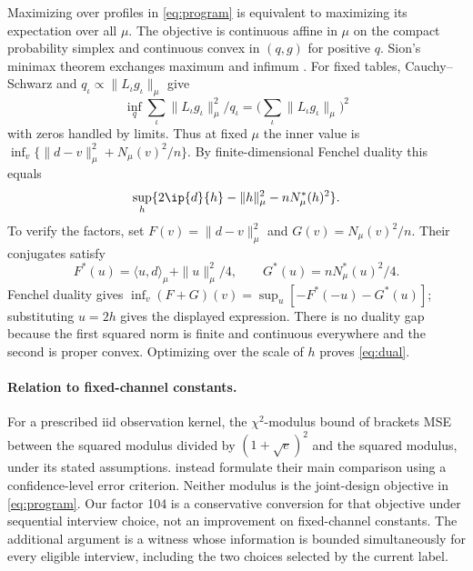 Maximizing over profiles in \eqref{eq:program} is equivalent to maximizing its expectation over all $\mu$. The objective is continuous affine in $\mu$ on the compact probability simplex and continuous convex in $(q,g)$ for positive $q$. Sion's minimax theorem exchanges maximum and infimum \citep{sion1958}. For fixed tables, Cauchy--Schwarz and $q_\iota\propto\|L_\iota g_\iota\|_\mu$ give
\[
 \inf_q \sum_\iota\|L_\iota g_\iota\|_\mu^2/q_\iota
      =\Big(\sum_\iota\|L_\iota g_\iota\|_\mu\Big)^2
\]
with zeros handled by limits. Thus at fixed $\mu$ the inner value is $\inf_v \{\|d-v\|_\mu^2+N_\mu(v)^2/n\}$. By finite-dimensional Fenchel duality this equals
\[
 \sup_h\{2\ip{d}{h}-\|h\|_\mu^2-nN_\mu^*(h)^2\}.
\]
To verify the factors, set $F(v)=\|d-v\|_\mu^2$ and $G(v)=N_\mu(v)^2/n$. Their conjugates satisfy
\[
 F^*(u)=\langle u,d\rangle_\mu+\|u\|_\mu^2/4,
 \qquad G^*(u)=nN_\mu^*(u)^2/4.
\]
Fenchel duality gives $\inf_v(F+G)(v)=\sup_u[-F^*(-u)-G^*(u)]$; substituting $u=2h$ gives the displayed expression. There is no duality gap because the first squared norm is finite and continuous everywhere and the second is proper convex. Optimizing over the scale of $h$ proves \eqref{eq:dual}.

\paragraph{Relation to fixed-channel constants.}
For a prescribed iid observation kernel, the $\chi^2$-modulus bound of \citet{polyanskiy2026} brackets MSE between the squared modulus divided by $(1+\sqrt e)^2$ and the squared modulus, under its stated assumptions. \citet{juditsky2009} instead formulate their main comparison using a confidence-level error criterion. Neither modulus is the joint-design objective in \eqref{eq:program}. Our factor 104 is a conservative conversion for that objective under sequential interview choice, not an improvement on fixed-channel constants. The additional argument is a witness whose information is bounded simultaneously for every eligible interview, including the two choices selected by the current label.

